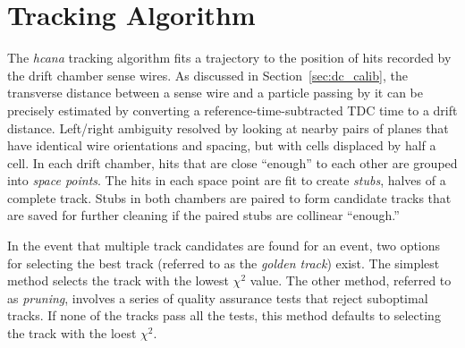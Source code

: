 \section{Tracking Algorithm}
The \textit{hcana} tracking algorithm fits a trajectory to the position of hits
recorded by the drift chamber sense wires.
As discussed in Section~\ref{sec:dc_calib}, the transverse distance between a
sense wire and a particle passing by it can be precisely estimated by
converting a reference-time-subtracted TDC time to a drift distance.
Left/right ambiguity resolved by looking at nearby pairs of planes that have
identical wire orientations and spacing, but with cells displaced by half a
cell.
In each drift chamber, hits that are close ``enough'' to each other are grouped
into \textit{space points}.
The hits in each space point are fit to create \textit{stubs}, halves of a
complete track.
Stubs in both chambers are paired to form candidate tracks that are saved for
further cleaning if the paired stubs are collinear ``enough.''


In the event that multiple track candidates are found for an event, two options
for selecting the best track (referred to as the \textit{golden track}) exist.
The simplest method selects the track with the lowest $\chi^2$ value.
The other method, referred to as \textit{pruning}, involves a series of quality
assurance tests that reject suboptimal tracks.
If none of the tracks pass all the tests, this method defaults to selecting the
track with the loest $\chi^2$.
